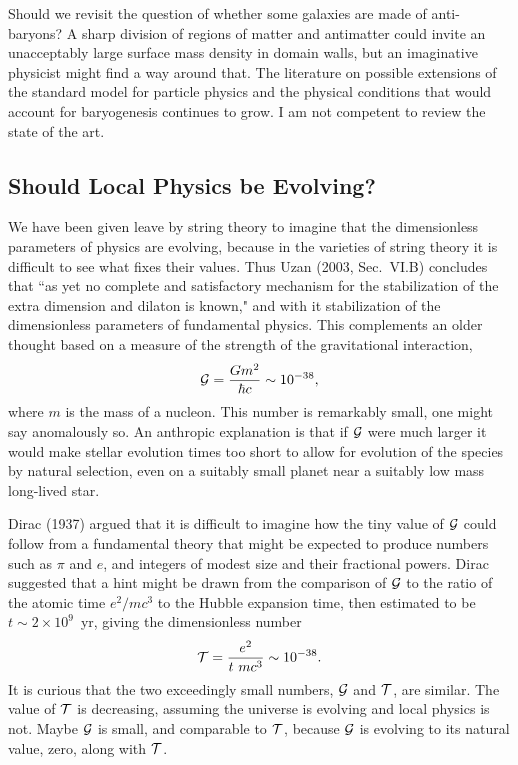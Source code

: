 \documentclass[fleqn,12pt]{article}
\newcommand{\beq}{\begin{equation}}
\newcommand{\eeq}{\end{equation}}
\begin{document}
Should we revisit the question of whether some galaxies are made of anti-baryons? A sharp division of regions of matter and antimatter could invite an unacceptably large surface mass density in domain walls, but an imaginative physicist might find a way around that. The literature on possible extensions of the standard model for particle physics and the physical conditions that would account for baryogenesis continues to grow. I am not competent to review the state of the art.

\subsection{Should Local Physics be Evolving?}\label{sec:EvolutionPhysics} 

We have been given leave by string theory to imagine that the dimensionless parameters of physics are evolving, because in the varieties of string theory it is difficult to see what fixes their values. Thus Uzan (2003, Sec.~VI.B) concludes that ``as yet no complete and satisfactory mechanism for the stabilization of the extra dimension and dilaton is known," and with it stabilization of the dimensionless parameters of fundamental physics. This complements an older thought based on a measure of the strength of the gravitational interaction, 
\beq
{\cal G} = {Gm^2\over \hbar c}\sim 10^{-38}, \label{gravitystrength}
\eeq
where $m$ is the mass of a nucleon. This number is remarkably small, one might say anomalously so. An anthropic explanation is that if ${\cal G}$ were much larger it would make stellar evolution times too short to allow for evolution of the species by natural selection, even on a suitably small planet near a suitably low mass long-lived star. 

Dirac (1937) argued that it is difficult to imagine how the tiny value of ${\cal G}$ could follow from a fundamental theory that might be expected to produce numbers such as $\pi$ and $e$, and integers of modest size and their fractional powers. Dirac suggested that a hint might be drawn from the comparison of ${\cal G}$ to the ratio of the atomic time $e^2/mc^3$ to the Hubble expansion time, then estimated to be $t \sim 2\times 10^9$~yr, giving the dimensionless number
\beq
{\cal T} = {e^2\over t~mc^3} \sim 10^{-38}. \label{atomictime}
\eeq
It is curious that the two exceedingly small numbers, ${\cal G}$ and ${\cal T}$, are similar. The value of ${\cal T}$ is decreasing, assuming the universe is evolving and local physics is not. Maybe ${\cal G}$ is small, and comparable to ${\cal T}$, because ${\cal G}$ is evolving to its natural value, zero, along with ${\cal T}$. 
\end{document}
